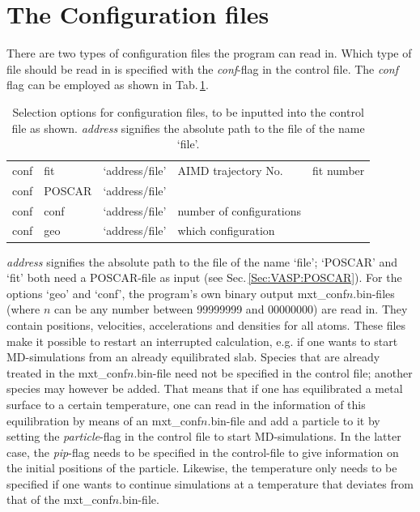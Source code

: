 \documentclass[twoside, 11pt, titlepage, captions=nooneline, a4paper, headsepline]{scrbook}%
\begin{document}
\section{The Configuration files}
\label{Sec:mxt:input}
There are two types of configuration files the program can read in. Which type of file should be read in is specified with the \textit{conf}-flag in the control file. The \textit{conf} flag can be employed as shown in Tab.\,\ref{Tab:mxt:conf}.
\begin{table}[b!]
\centering
\caption{Selection options for configuration files, to be inputted into the control file as shown. \textit{address} signifies the absolute path to the file of the name `file'.}
\label{Tab:mxt:conf}
\begin{tabular}{p{1cm}p{2cm}p{2cm}p{4.5cm}p{3cm}}
\hline\hline
conf\index{conf} & fit & `address/file' & AIMD trajectory No. & fit number\\
conf & POSCAR & `address/file' & &\\
conf & conf & `address/file' & number of configurations&\\
conf & geo & `address/file' & which configuration&\\
\hline
\hline
\end{tabular}
\end{table}
\textit{address} signifies the absolute path to the file of the name `file'; `POSCAR' and `fit' both need a POSCAR-file as input (see Sec.\,\ref{Sec:VASP:POSCAR}). For the options `geo' and `conf', the program's own binary output mxt\_conf$n$.bin-files (where $n$ can be any number between 99999999 and 00000000) are read in. They contain positions, velocities, accelerations and densities for all atoms. These files make it possible to restart an interrupted calculation, e.g. if one wants to start MD-simulations from an already equilibrated slab. Species that are already treated in the mxt\_conf$n$.bin-file need not be specified in the control file; another species may however be added. That means that if one has equilibrated a metal surface to a certain temperature, one can read in the information of this equilibration by means of an mxt\_conf$n$.bin-file and add a particle to it by setting the \textit{particle}-flag in the control file to start MD-simulations. In the latter case, the \textit{pip}-flag needs to be specified in the control-file to give information on the initial positions of the particle. Likewise, the temperature only needs to be specified if one wants to continue simulations at a temperature that deviates from that of the mxt\_conf$n$.bin-file.
\end{document}
